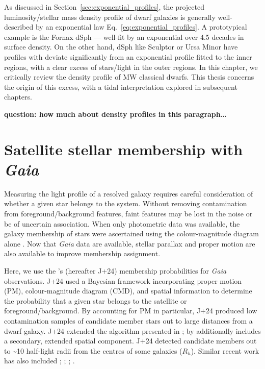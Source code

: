 As discussed in Section~\ref{sec:exponential_profiles}, the projected
luminosity/stellar mass density profile of dwarf galaxies is generally
well-described by an exponential law Eq.~\ref{eq:exponential_profiles}.
A prototypical example is the Fornax dSph --- well-fit by an exponential
over 4.5 decades in surface density. On the other hand, dSph like
Sculptor or Ursa Minor have profiles with deviate significantly from an
exponential profile fitted to the inner regions, with a clear excess of
stars/light in the outer regions. In this chapter, we critically review
the density profile of MW classical dwarfs. This thesis concerns the
origin of this excess, with a tidal interpretation explored in
subsequent chapters.

\textbf{question: how much about density profiles in this
paragraph\ldots{}}

\section{\texorpdfstring{Satellite stellar membership with
\emph{Gaia}}{Satellite stellar membership with Gaia}}\label{satellite-stellar-membership-with-gaia}

Measuring the light profile of a resolved galaxy requires careful
consideration of whether a given star belongs to the system. Without
removing contamination from foreground/background features, faint
features may be lost in the noise or be of uncertain association. When
only photometric data was available, the galaxy membership of stars were
ascertained using the colour-magnitude diagram alone \citep[e.g.,
matched filter methods like][]{rockosi+2002}. Now that \emph{Gaia} data
are available, stellar parallax and proper motion are also available to
improve membership assignment.

Here, we use the \citet{jensen+2024}'s (hereafter J+24) membership
probabilities for \emph{Gaia} observations. J+24 used a Bayesian
framework incorporating proper motion (PM), colour-magnitude diagram
(CMD), and spatial information to determine the probability that a given
star belongs to the satellite or foreground/background. By accounting
for PM in particular, J+24 produced low contamination samples of
candidate member stars out to large distances from a dwarf galaxy. J+24
extended the algorithm presented in \citet{MV2020a}; \citet{MV2020b} by
additionally includes a secondary, extended spatial component. J+24
detected candidate members out to \textasciitilde10 half-light radii
from the centres of some galaxies (\(R_h\)). Similar recent work has
also included \citet{pace+li2019}; \citet{battaglia+2022};
\citet{pace+erkal+li2022}; \citet{qi+2022}.


